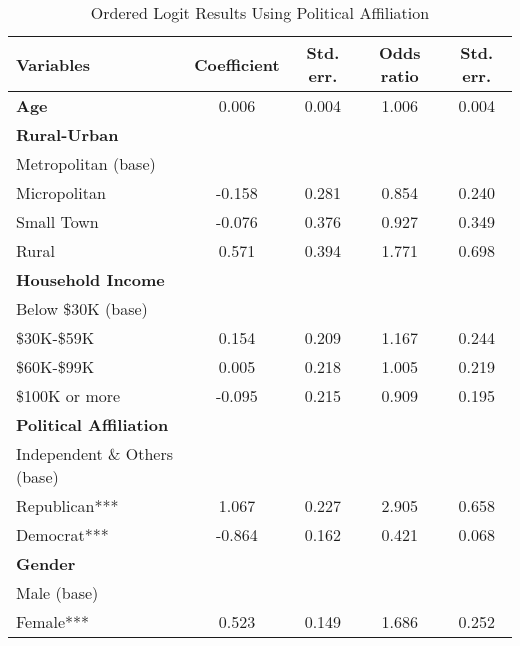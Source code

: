 \begin{table}[H]
\centering
\caption{Ordered Logit Results Using Political Affiliation}
\label{tab:ologit-pol}
\begin{tabular}{lcccc}
\toprule
\textbf{Variables} & \textbf{Coefficient} & \textbf{Std. err.} & \textbf{Odds ratio} & \textbf{Std. err.} \\ \midrule
\textbf{Age}                          & 0.006       & 0.004     & 1.006      & 0.004     \\
\textbf{Rural-Urban}                  &             &           &            &           \\
Metropolitan (base)          &             &           &            &           \\
Micropolitan                 & -0.158      & 0.281     & 0.854      & 0.240     \\
Small Town                   & -0.076      & 0.376     & 0.927      & 0.349     \\
Rural                        & 0.571       & 0.394     & 1.771      & 0.698     \\
\textbf{Household Income}             &             &           &            &           \\
Below \$30K (base)           &             &           &            &           \\
\$30K-\$59K                  & 0.154       & 0.209     & 1.167      & 0.244     \\
\$60K-\$99K                  & 0.005       & 0.218     & 1.005      & 0.219     \\
\$100K or more               & -0.095      & 0.215     & 0.909      & 0.195     \\
\textbf{Political Affiliation}        &             &           &            &           \\
Independent \& Others (base) &             &           &            &           \\
Republican***                & 1.067       & 0.227     & 2.905      & 0.658     \\
Democrat***                  & -0.864      & 0.162     & 0.421      & 0.068     \\
\textbf{Gender}                       &             &           &            &           \\
Male (base)                  &             &           &            &           \\
Female***                    & 0.523       & 0.149     & 1.686      & 0.252     \\

\end{tabular}
\end{table}
